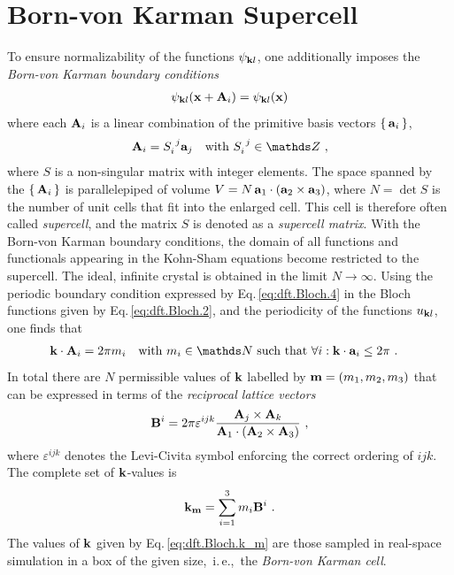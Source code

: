 \chapter{Born-von Karman Supercell}
To ensure normalizability of the functions $\psi_{{\bf k}l}$, one additionally imposes the \emph{Born-von Karman boundary conditions}
\begin{align}
\psi_{{\bf k}l} ({\bf x} + {\bf A}_i) 
= \psi_{{\bf k}l} ({\bf x})
\end{align}
where each ${\bf A}_i$ is a linear combination of the primitive basis vectors $\set{{\bf a}_i}$,
\begin{align}
{\bf A}_i = S_i^{~j} {\bf a}_j\quad\text{with } S_i^{~j} \in \mathds Z~,
\end{align}
where $S$ is a non-singular matrix with integer elements. The space spanned by the $\set{{\bf A}_i}$ is parallelepiped of volume $V = N \, {\bf a}_1 \cdot ({\bf a}_2 \times {\bf a}_3)$, where $N = \det S$ is the number of unit cells that fit into the enlarged cell. This cell is therefore often called \emph{supercell}, and the matrix $S$ is denoted as a \emph{supercell matrix}.
With the Born-von Karman boundary conditions, the domain of all functions and functionals appearing in the Kohn-Sham equations become restricted to the supercell. The ideal, infinite crystal is obtained in the limit $N \rightarrow \infty$.
Using the periodic boundary condition expressed by Eq.\,\eqref{eq:dft.Bloch.4} in the Bloch functions given by Eq.\,\eqref{eq:dft.Bloch.2}, and the periodicity of the functions $u_{{\bf k} l}$, one finds that
\begin{align}
{\bf k} \cdot {\bf A}_i
&= 2 \pi m_i\quad\text{with } m_i \in \mathds N \text{ such that } 
\forall i: {\bf k} \cdot {\bf a}_i \leq 2 \pi~.
\end{align}
In total there are $N$ permissible values of $\bf k$ labelled by ${\bf m} = (m_1, m_2, m_3)$ that can be expressed in terms of the \emph{reciprocal lattice vectors}~\cite{Sands2002}
\begin{align}
{\bf B}^i 
= 2 \pi \varepsilon^{ijk} \frac{{\bf A}_j \times {\bf A}_k}{{\bf A}_1 \cdot ({\bf A}_2 \times {\bf A}_3)} ~,
\end{align}
where $\varepsilon^{ijk}$ denotes the Levi-Civita symbol enforcing the correct ordering of $ijk$. The complete set of $\bf k$-values is
\begin{align}
{\bf k}_{\bf m} 
= \sum_{i=1}^3 m_i {\bf B}^i~.
\end{align}
The values of $\bf k$ given by Eq.\,\eqref{eq:dft.Bloch.k_m} are those sampled in real-space simulation in a box of the given size,~i.\,e.,~the \emph{Born-von Karman cell}.

